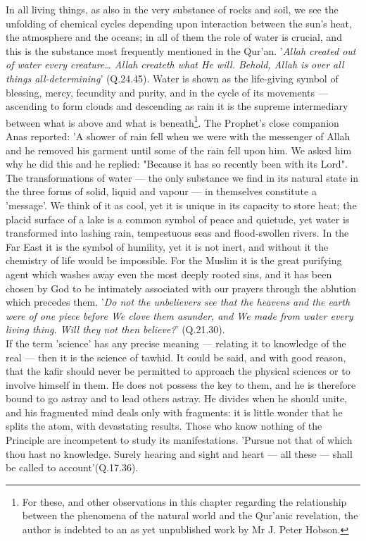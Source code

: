 \documentclass[11pt, b5paper, twoside]{book}
\begin{document}
In all living things, as also in the very substance of rocks and soil, we see the unfolding of 
chemical cycles depending upon interaction between the sun's heat, the atmosphere and the oceans; in 
all of them the role of water is crucial, and this is the substance most frequently mentioned in the 
Qur'an. '\emph{Allah created out of water every creature\ldots{} Allah createth what He will. Behold, Allah is over all things all-determining}' (Q.24.45). Water is shown as the life-giving symbol of blessing, 
mercy, fecundity and purity, and in the cycle of its movements --- ascending to form clouds and 
descending as rain it is the supreme intermediary between what is above and what is beneath\footnote{For these, and other observations in this chapter regarding the relationship between the phenomena of the natural world and the Qur'anic revelation, the author is indebted to an as yet unpublished work by Mr J. Peter Hobson.}. The Prophet's close companion Anas reported: 'A shower of rain fell when we were with the messenger of Allah and he removed his garment until some of the rain fell upon him. We asked him why he did this and he replied: "Because it has so recently been with its Lord". \\

The transformations of water --- the only substance we find in its natural state in the three forms of 
solid, liquid and vapour --- in themselves constitute a 'message'. We think of it as cool, yet it is 
unique in its capacity to store heat; the placid surface of a lake is a common symbol of peace and 
quietude, yet water is transformed into lashing rain, tempestuous seas and flood-swollen rivers. In 
the Far East it is the symbol of humility, yet it is not inert, and without it the chemistry of life 
would be impossible. For the Muslim it is the great purifying agent which washes away even the most 
deeply rooted sins, and it has been chosen by God to be intimately associated with our prayers 
through the ablution which precedes them. '\emph{Do not the unbelievers see that the heavens and the earth were of one piece before We clove them asunder, and We made from water every living thing. Will they not then believe?}' (Q.21.30). \\

If the term 'science' has any precise meaning --- relating it to knowledge of the real --- then it is the 
science of tawhid. It could be said, and with good reason, that the kafir should never be permitted 
to approach the physical sciences or to involve himself in them. He does not possess the key to them, 
and he is therefore bound to go astray and to lead others astray. He divides when he should unite, 
and his fragmented mind deals only with fragments: it is little wonder that he splits the atom, with 
devastating results. Those who know nothing of the Principle are incompetent to study its 
manifestations. 'Pursue not that of which thou hast no knowledge. Surely hearing and sight and heart 
--- all these --- shall be called to account'(Q.17.36). \\
\end{document}
